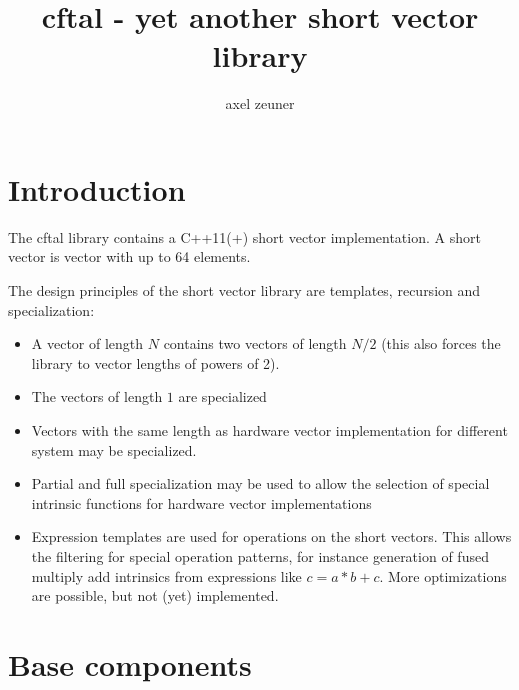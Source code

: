 \documentclass[10pt,a4paper,wide]{article}
\numberwithin{equation}{subsection}
\begin{document}
\title{cftal - yet another short vector library}
\author{axel zeuner}
\maketitle

\tableofcontents

\section{Introduction}
\label{sec:introduction}

The cftal library contains a C++11(+) short vector implementation. A
short vector is vector with up to 64 elements.

The design principles of the short vector library are
templates, recursion and specialization:

\begin{itemize}
\item A vector of length $N$ contains two vectors of length $N/2$
  (this also forces the library to vector lengths of powers of 2).
\item The vectors of length $1$ are specialized
\item Vectors with the same length as hardware vector implementation
  for different system may be specialized.
\item Partial and full specialization may be used to allow the
  selection of special intrinsic functions for hardware vector
  implementations
\item Expression templates are used for operations on the short
  vectors. This allows the filtering for special operation patterns,
  for instance generation of fused multiply add intrinsics from
  expressions like $ c= a* b + c $. More optimizations are possible,
  but not (yet) implemented.
\end{itemize}

\section{Base components}
\label{sec:base}
\end{document}
